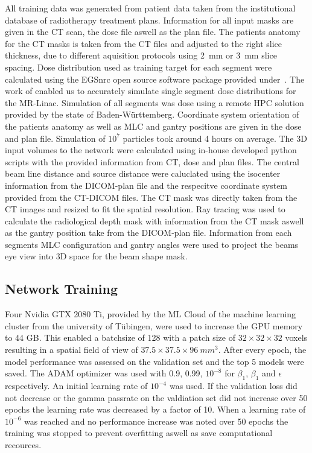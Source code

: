 All training data was generated from patient data taken from the institutional database of radiotherapy treatment plans. 
Information for all input masks are given in the CT scan, the dose file aswell as the plan file. 
The patients anatomy for the CT masks is taken from the CT files and adjusted to the right slice thickness, due to different aquisition protocols using 2~mm or 3~mm slice spacing. 
Dose distribution used as training target for each segment were calculated using the EGSnrc open source software package provided under~\cite{noauthor_nrc-cnrcegsnrc_2021}. 
The work of \citeauthor{friedel_development_2019} enabled us to accurately simulate single segment dose distributions for the MR-Linac. 
Simulation of all segments was dose using a remote \ac{HPC} solution provided by the state of Baden-Württemberg. 
Coordinate system orientation of the patients anatomy as well as \ac{MLC} and gantry positions are given in the dose and plan file. 
Simulation of $10^7$ particles took around 4 hours on average.
The 3D input volumes to the network were calculated using in-house developed python scripts with the provided information from CT, dose and plan files. 
The central beam line distance and source distance were caluclated using the isocenter information from the DICOM-plan file and the respecitve coordinate system provided from the CT-DICOM files.
The CT mask was directly taken from the CT images and resized to fit the spatial resolution. 
Ray tracing was used to calculate the radiological depth mask with information from the CT mask aswell as the gantry position take from the DICOM-plan file.
Information from each segments \acs{MLC} configuration and gantry angles were used to project the beams eye view into 3D space for the beam shape mask.

\subsection{Network Training}

Four Nvidia GTX 2080 Ti, provided by the ML Cloud of the machine learning cluster from the university of Tübingen, were used to increase the \acs{GPU} memory to 44 GB.
This enabled a batchsize of 128 with a patch size of $32 \times 32 \times 32$ voxels resulting in a spatial field of view of $37.5 \times 37.5 \times 96~mm^3$. 
After every epoch, the model performance was assessed on the validation set and the top 5 models were saved. 
The ADAM optimizer was used with 0.9, 0.99, $10^{-8}$ for $\beta_1$, $\beta_1$ and $\epsilon$ respectively. 
An initial learning rate of $10^{-4}$ was used. If the validation loss did not decrease or the gamma passrate on the valdiation set did not increase over 50 epochs the learning rate was decreased by a factor of 10. 
When a learning rate of $10^{-6}$ was reached and no performance increase was noted over 50 epochs the training was stopped to prevent overfitting aswell as save computational recources.
 

